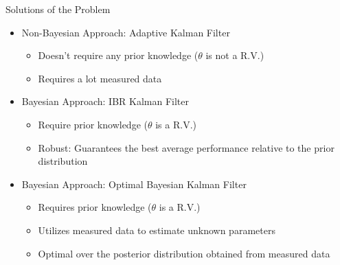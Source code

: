 \begin{frame}{Solutions of the Problem}
\begin{itemize}
    \item Non-Bayesian Approach: Adaptive Kalman Filter
    \begin{itemize}
        \item Doesn't require any prior knowledge ($\theta$ is not a R.V.)
        \item Requires a lot measured data
    \end{itemize}
    \pause
    \item Bayesian Approach: IBR Kalman Filter
    \begin{itemize}
        \item Require prior knowledge ($\theta$ is a R.V.)
        \item Robust: Guarantees the best average performance relative to the prior distribution
    \end{itemize}
    \pause
    \item Bayesian Approach: Optimal Bayesian Kalman Filter
    \begin{itemize}
        \item Requires prior knowledge ($\theta$ is a R.V.)
        \item Utilizes measured data to estimate unknown parameters
        \item Optimal over the posterior distribution obtained from measured data
    \end{itemize}
\end{itemize}    
\end{frame}